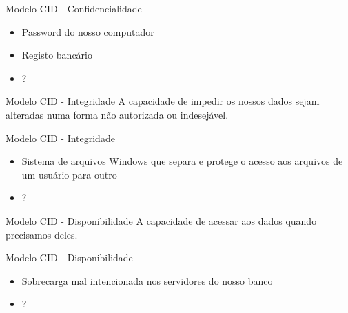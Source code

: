 \documentclass{beamer}
\begin{document}
\begin{frame}{Modelo CID - Confidencialidade}
\begin{itemize}
\item Password do nosso computador
\item Registo bancário
\item ? 
\end{itemize}
\end{frame}

\begin{frame}{Modelo CID - Integridade}
A capacidade de impedir os nossos dados sejam alteradas numa forma não autorizada ou indesejável.
\end{frame}

\begin{frame}{Modelo CID - Integridade}
\begin{itemize}
\item Sistema de arquivos Windows que separa e protege o acesso aos arquivos de um usuário para outro
\item ?
\end{itemize}
\end{frame}

\begin{frame}{Modelo CID - Disponibilidade}
A capacidade de acessar aos dados quando precisamos deles.
\end{frame}

\begin{frame}{Modelo CID - Disponibilidade}
\begin{itemize}
\item Sobrecarga mal intencionada nos servidores do nosso banco
\item ?
\end{itemize}
\end{frame}
\end{document}

